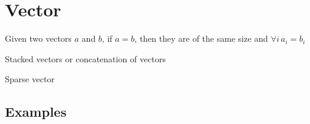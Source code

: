 \documentclass[a4paper,12pt]{article}
\begin{document}
\section{Vector}
Given two vectors $a$ and $b$, if $a = b$, then they are of the same size and $\forall i\, a_{i} = b_{i}$

Stacked vectors or concatenation of vectors

Sparse vector

\subsection{Examples}
\end{document}

